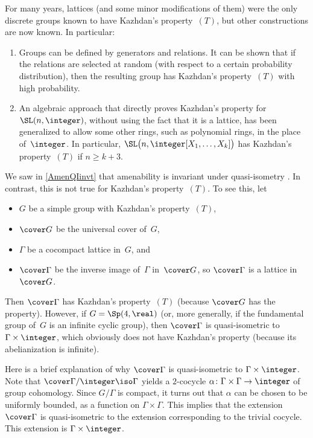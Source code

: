 \begin{rem} \label{OtherT}
For many years, lattices (and some minor modifications of them) were the only discrete groups known to have Kazhdan's property~$(T)$, but other constructions are now known. In particular:
\noprelistbreak
	\begin{enumerate}
	\item \label{OtherT-random}
	Groups can be defined by generators and relations. It can be shown that if the relations are selected at random (with respect to a certain probability distribution), then the resulting group has Kazhdan's property~$(T)$ with high probability.
	\item \label{OtherT-Alg}
	An algebraic approach that directly proves Kazhdan's property for $\SL(n,\integer)$, without using the fact that it is a lattice, has been generalized to allow some other rings, such as polynomial rings, in the place of~$\integer$. In particular, $\SL \bigl( n, \integer[X_1,\ldots,X_k] \bigr)$ has Kazhdan's property~$(T)$ if $n \ge k + 3$.
	\end{enumerate}
\end{rem}



\begin{rem} \label{TnotQI}
We saw in \cref{AmenQIinvt} that amenability is invariant under quasi-isometry . In contrast, this is not true for Kazhdan's property~$(T)$.
To see this, let 
\noprelistbreak
	\begin{itemize}
	\item $G$ be a simple group with Kazhdan's property~$(T)$, 
	\item $\cover G$ be the universal cover of~$G$,
	\item $\Gamma$ be a cocompact lattice in~$G$,
	and
	\item $\cover\Gamma$ be the inverse image of~$\Gamma$ in~$\cover G$, so $\cover\Gamma$ is a lattice in~$\cover G$.
	\end{itemize}
Then $\cover\Gamma$ has Kazhdan's property~$(T)$ (because $\cover G$ has the property). However, if $G = \Sp(4,\real)$ (or, more generally, if the fundamental group of~$G$ is an infinite cyclic group), then $\cover\Gamma$ is quasi-isometric to $\Gamma \times \integer$, which obviously does not have Kazhdan's property (because its abelianization is infinite).

Here is a brief explanation of why $\cover\Gamma$ is quasi-isometric to $\Gamma \times \integer$. Note that $\cover\Gamma/\integer \iso \Gamma$ yields a $2$-cocycle $\alpha \colon \Gamma \times \Gamma \to \integer$ of group cohomology. 
Since $G/\Gamma$ is compact, it turns out that $\alpha$ can be chosen to be uniformly bounded, as a function on $\Gamma \times \Gamma$. This implies that the extension~$\cover\Gamma$ is quasi-isometric to the extension corresponding to the trivial cocycle. This extension is $\Gamma \times \integer$.
\end{rem}



